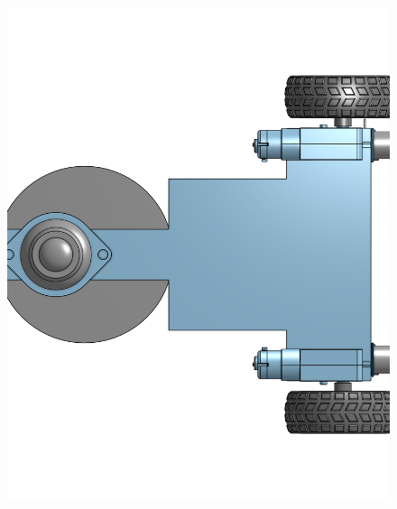 \documentclass[a4paper,12pt]{article}
\begin{document}
\begin{center}\begin{figure}[H]\centering\includegraphics[height=0.45\textheight]{./model_images/a7.png}\end{figure}\FloatBarrier\end{center}
\end{document}
